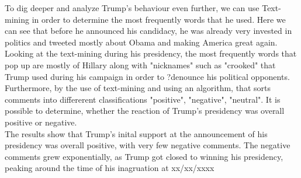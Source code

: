 \documentclass{article}
\begin{document}
To dig deeper and analyze Trump's behaviour even further, we can use Text-mining in order to determine the most frequently words that he used. Here we can see that before he announced his candidacy, he was already very invested in politics and tweeted mostly about Obama and making America great again. Looking at the text-mining during his presidency, the most frequently words that pop up are mostly of Hillary along with "nicknames" such as "crooked" that Trump used during his campaign in order to ?denounce his political opponents.  \\


Furthermore, by the use of text-mining and using an algorithm, that sorts comments into differerent classifications "positive", "negative", "neutral". It is possible to determine, whether the reaction of Trump's presidency was overall positive or negative. \\

The results show that Trump's inital support at the announcement of his presidency was overall positive, with very few negative comments.  The negative comments grew exponentially, as Trump got closed to winning his presidency, peaking around the time of his inagruation at xx/xx/xxxx




\end{document}
